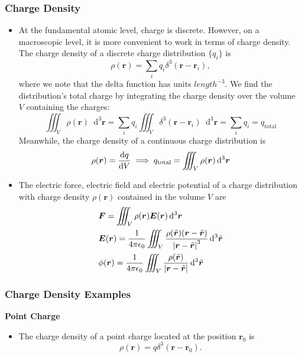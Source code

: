 \documentclass[11pt, a4paper]{article}
\newcommand{\diff}{\mathop{}\!\mathrm{d}} %
\newcommand{\dr}{\diff^{3} \r}  %
\newcommand{\dtr}{\diff^{3} \tilde{\r}}  %
\renewcommand{\vec}[1]{\bm{#1}} %
\renewcommand{\t}[1]{\tilde{#1}} %
\renewcommand{\r}{\vec{r}}
\newcommand{\E}{\vec{E}} %
\newcommand{\ee}{\epsilon_{0}}  %
\begin{document}
\subsubsection{Charge Density}
\begin{itemize}
	\item At the fundamental atomic level, charge is discrete. However, on a macroscopic level, it is more convenient to work in terms of charge density. The charge density of a discrete charge distribution $ \{q_{i}\} $ is
	\begin{equation*}
		\rho (\r) = \sum_{i} q_{i}\delta^{3}(\r - \r_{i}),
	\end{equation*}
	where we note that the delta function has units $ \si{length^{-3}} $. We find the distribution's total charge by integrating the charge density over the volume $ V $ containing the charges:
	\begin{equation*}
		\iiint_{V} \rho(\r) \dr  = \sum_{i} q_{i}\iiint_{V} \delta^{3}(\r - \r_{i})\dr = \sum_{i} q_{i} = q_{\text{total}}
	\end{equation*}
	Meanwhile, the charge density of a continuous charge distribution is
	\begin{equation*}
		\rho(\r) = \dv{q}{V} \implies q_{\text{total}} = \iiint_{V} \rho(\r) \dr
	\end{equation*}
	
	\item The electric force, electric field and electric potential of a charge distribution with charge density $ \rho(\r) $  contained in the volume $ V $ are
	\begin{align*}
		& \vec{F} = \iiint_{V} \rho(\r) \E(\r) \dr \\
		& \E(\r) = \frac{1}{4\pi \ee} \iiint_{V}\frac{\rho(\t{\r})(\r - \t{\r})}{\abs{\r - \t{\r}}^{3}} \dtr\\
		& \phi (\r) = \frac{1}{4\pi \ee}\iiint_{V}\frac{\rho(\t{\r})}{\abs{\r - \t{\r}}}\dtr
	\end{align*}
\end{itemize}

\subsubsection{Charge Density Examples}

\vspace{2mm}
\textbf{Point Charge} 
\begin{itemize}
	\item The charge density of a point charge located at the position $ \r_{0} $ is
	\begin{equation*}
		\rho (\r) = q \delta^{3}(\r - \r_{0}).
	\end{equation*}
\end{itemize}	
	
\end{document}
